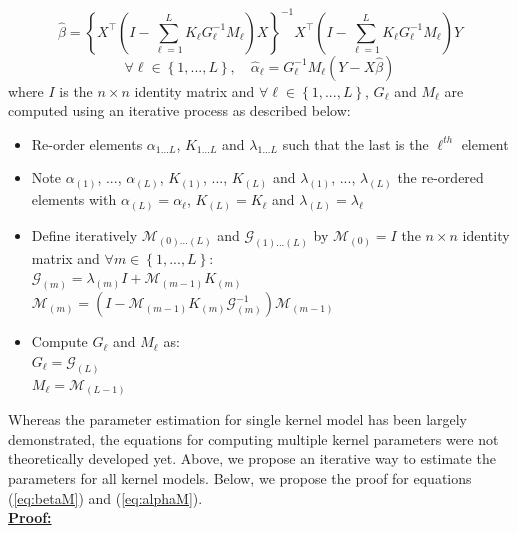 \begin{equation}\label{eq:betaM}
\hat{\beta} =  \left\lbrace X^\top \left( I - \sum\limits_{\ell = 1}^L K_{\ell} G_{\ell}^{-1} M_{\ell} \right) X  \right\rbrace^{-1}  X^\top \left(I - \sum\limits_{\ell = 1}^L K_{\ell} G_{\ell}^{-1} M_{\ell}\right) Y
\end{equation}
\begin{equation}\label{eq:alphaM}
\forall \ell \in \left\lbrace 1,..., L\right\rbrace, \quad \hat{\alpha}_{\ell} =  G_{\ell}^{-1} M_{\ell} \left(Y-X\hat{\beta}\right)
\end{equation}
where $I$ is the $n \times n$ identity matrix and $\forall \ell \in \left\lbrace 1, ..., L \right\rbrace$, $G_{\ell}$ and $M_{\ell}$ are computed using an iterative process as described below:
\begin{itemize}
    \item Re-order elements $\alpha_{1...L}$, $K_{1...L}$ and $\lambda_{1...L}$ such that the last is the $\ell^{th}$ element
    \item Note $\alpha_{(1)}$, ..., $\alpha_{(L)}$, $K_{(1)}$, ..., $K_{(L)}$ and $\lambda_{(1)}$, ..., $\lambda_{(L)}$ the re-ordered elements with $\alpha_{(L)} = \alpha_{\ell}$, $K_{(L)} = K_{\ell}$ and $\lambda_{(L)} = \lambda_{\ell}$
    \item Define iteratively $\mathcal{M}_{(0)...(L)}$ and $\mathcal{G}_{(1)...(L)}$ by $\mathcal{M}_{(0)} = I$ the $n \times n$ identity matrix and $\forall m \in \left\lbrace 1, ..., L \right\rbrace$: \\
    $\mathcal{G}_{(m)} = \lambda_{(m)} I + \mathcal{M}_{(m-1)} K_{(m)}$ \\
    $\mathcal{M}_{(m)} = \left(I - \mathcal{M}_{(m-1)} K_{(m)} \mathcal{G}_{(m)}^{-1} \right) \mathcal{M}_{(m-1)}$
    \item Compute $G_{\ell}$ and $M_{\ell}$ as:\\
$G_{\ell} = \mathcal{G}_{(L)}$ \\
$M_{\ell} = \mathcal{M}_{(L-1)}$
\end{itemize}


\noindent Whereas the parameter estimation for single kernel model has been largely demonstrated, the equations for computing multiple kernel parameters were not theoretically developed yet. Above, we propose an iterative way to estimate the parameters for all kernel models. Below, we propose the proof for equations (\ref{eq:betaM}) and (\ref{eq:alphaM}).\\

\noindent \textbf{\underline{Proof:}} \\

